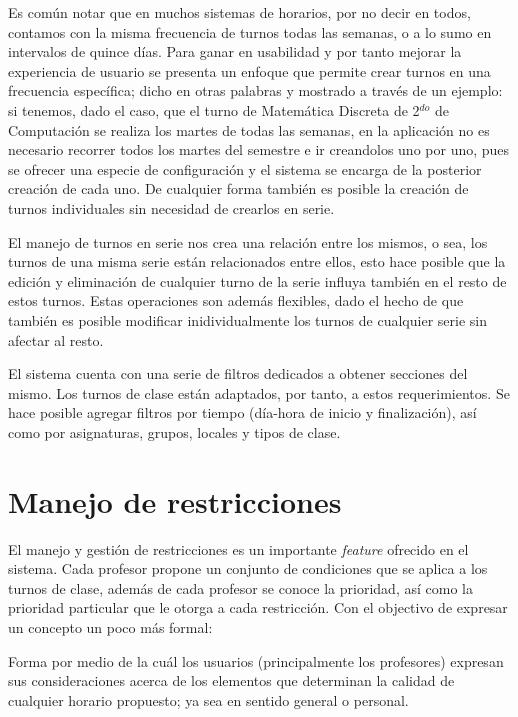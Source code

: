 Es común notar que en muchos sistemas de horarios, por no decir en todos, contamos con la misma frecuencia de turnos todas las semanas, o a lo sumo en intervalos de quince días. Para ganar en usabilidad y por tanto mejorar la experiencia de usuario se presenta un enfoque que permite crear turnos en una frecuencia específica; dicho en otras palabras y mostrado a través de un ejemplo: si tenemos, dado el caso, que el turno de Matemática Discreta de 2$^{do}$ de Computación se realiza los martes de todas las semanas, en la aplicación no es necesario recorrer todos los martes del semestre e ir creandolos uno por uno, pues se ofrecer una especie de configuración y el sistema se encarga de la posterior creación de cada uno. De cualquier forma también  es posible la creación de turnos individuales sin necesidad de crearlos en serie.

El manejo de turnos en serie nos crea una relación entre los mismos, o sea, los turnos de una misma serie están relacionados entre ellos, esto hace posible que la edición y eliminación de cualquier turno de la serie influya también en el resto de estos turnos. Estas operaciones son además flexibles, dado el hecho de que también es posible modificar inidividualmente los turnos de cualquier serie sin afectar al resto.

El sistema cuenta con una serie de filtros dedicados a obtener secciones del mismo. Los turnos de clase están adaptados, por tanto, a estos requerimientos. Se hace posible agregar filtros por tiempo (día-hora de inicio y finalización), así como por asignaturas, grupos, locales y tipos de clase. 

\section{Manejo de restricciones}
\label{sec:restrictions}

El manejo y gestión de restricciones es un importante \textit{feature} ofrecido en el sistema. Cada profesor propone un conjunto de condiciones que se aplica a los turnos de clase, además de cada profesor se conoce la prioridad, así como la prioridad particular que le otorga a cada restricción. 
Con el objectivo de expresar un concepto un poco más formal: 
\begin{dfn}[Restricción]
	Forma por medio de la cuál los usuarios (principalmente los profesores) expresan sus consideraciones acerca de los elementos que determinan la calidad de cualquier horario propuesto; ya sea en sentido general o personal.
\end{dfn} 

